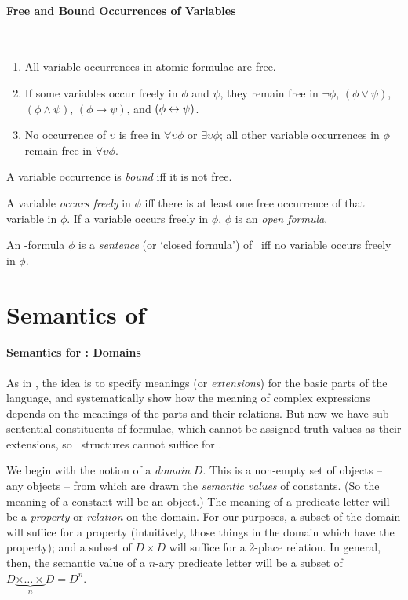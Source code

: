 \paragraph{Free and Bound Occurrences of Variables}

\begin{definition}~
	
\begin{enumerate}
	\item All variable occurrences in atomic formulae are free.
	\item If some variables occur freely in $\phi$ and $\psi$, they remain free in $\neg\phi$, $(\phi\vee\psi)$, $(\phi\wedge\psi)$, $(\phi\to\psi)$, and $(\phi\leftrightarrow\psi)$. 
	\item No occurrence of $\upsilon$ is free in $\forall \upsilon \phi$ or $\exists \upsilon \phi$; all other variable occurrences in $\phi$ remain free in $\forall \upsilon \phi$. 
\end{enumerate}
A variable occurrence is \emph{bound} iff it is not free.
\end{definition}

A variable \emph{occurs freely} in $\phi$ iff there is at least one free occurrence of that variable in $\phi$. If a variable occurs freely in $\phi$, $\phi$ is an \emph{open formula}.

\begin{definition}
An \ltwo-formula	$\phi$ is a \emph{sentence} (or `closed formula') of \ltwo\ iff no variable occurs freely in $\phi$. 
\end{definition}  


\section{Semantics of \ltwo}
\paragraph{Semantics for \ltwo: Domains}

As in \lone, the idea is to specify meanings (or \emph{extensions}) for the basic parts of the language, and systematically show how the meaning of complex expressions depends on the meanings of the parts and their relations. But now we have sub-sentential constituents of formulae, which cannot be assigned truth-values as their extensions, so \lone\ structures cannot suffice for \ltwo.

 We begin with the notion of a \emph{domain} $D$. This is a non-empty set of objects – any objects – from which are drawn the \emph{semantic values} of constants. (So the meaning of a constant will be an object.) The meaning of a predicate letter will be a \emph{property} or \emph{relation} on the domain. For our purposes, a subset of the domain will suffice for a property (intuitively, those  things in the domain which have the property); and a subset of $D\times D$ will suffice for a 2-place relation. In general, then, the semantic value of a $n$-ary predicate letter will be a subset of $D\underbrace{\times\ldots\times}_{n} D = D^{n}$.

